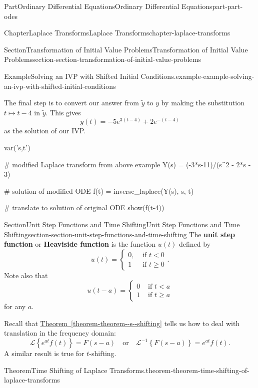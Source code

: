 \documentclass[twoside,10pt,]{book}
\newcommand{\xreffont}{\relax}
\newcommand{\terminology}[1]{\textbf{#1}}
\numberwithin{equation}{part}
\newcommand{\Laplace}[1]{\mathcal{L}\set{#1}}
\newcommand{\iLaplace}[1]{\mathcal{L}^{-1}\set{#1}}
\newcommand{\set}[1]{\left\{ #1 \right\}}
\newcommand{\lt}{<}
\newcommand{\amp}{&}
\begin{document}
\begin{partptx}{Part}{Ordinary Differential Equations}{}{Ordinary Differential Equations}{}{}{part-part-odes}
\begin{chapterptx}{Chapter}{Laplace Transforms}{}{Laplace Transforms}{}{}{chapter-laplace-transforms}
\begin{sectionptx}{Section}{Transformation of Initial Value Problems}{}{Transformation of Initial Value Problems}{}{}{section-section-transformation-of-initial-value-problems}
\begin{example}{Example}{Solving an IVP with Shifted Initial Conditions.}{example-example-solving-an-ivp-with-shifted-initial-conditions}
\par
The final step is to convert our answer from \(\widetilde{y}\) to \(y\) by making the substitution \(t\mapsto t-4\) in \(\widetilde{y}\). This gives%
\begin{equation*}
y(t) = -5e^{3(t-4)} + 2e^{-(t-4)}
\end{equation*}
as the solution of our IVP.%
\end{example}
\begin{sageinput}
var('s,t')

# modified Laplace transform from above example
Y(s) = (-3*s-11)/(s^2 - 2*s - 3)

# solution of modified ODE
f(t) = inverse_laplace(Y(s), s, t)

# translate to solution of original ODE
show(f(t-4))
\end{sageinput}
\end{sectionptx}
%
%
\typeout{************************************************}
\typeout{************************************************}
%
\begin{sectionptx}{Section}{Unit Step Functions and Time Shifting}{}{Unit Step Functions and Time Shifting}{}{}{section-section-unit-step-functions-and-time-shifting}
The \terminology{unit step function} or \terminology{Heaviside function} is the function \(u(t)\) defined by%
\begin{equation*}
u(t) = \begin{cases}
0, \amp\text{ if }t\lt 0\\
1 \amp\text{ if } t\geq0
\end{cases}.
\end{equation*}
Note also that%
\begin{equation*}
u(t-a) = \begin{cases}
0 \amp\text{ if }t\lt a\\
1 \amp\text{ if } t\geq a
\end{cases}
\end{equation*}
for any \(a\).%
\par
Recall that \hyperref[theorem-theorem--s--shifting]{Theorem~{\xreffont\ref{theorem-theorem--s--shifting}}} tells us how to deal with translation in the frequency domain:%
\begin{equation*}
\Laplace{e^{at}f(t)} = F(s-a) \quad\text{or}\quad\iLaplace{F(s-a)} = e^{at}f(t).
\end{equation*}
A similar result is true for \(t\)-shifting.%
\begin{theorem}{Theorem}{Time Shifting of Laplace Transforms.}{}{theorem-theorem-time-shifting-of-laplace-transforms}%

\end{theorem}
\end{sectionptx}
\end{chapterptx}
\end{partptx}
\end{document}
